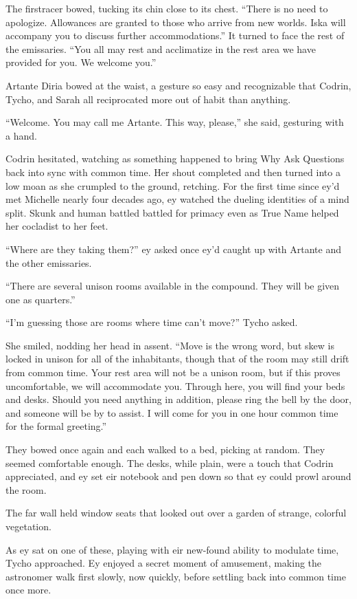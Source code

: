 The firstracer bowed, tucking its chin close to its chest. ``There is no need to apologize. Allowances are granted to those who arrive from new worlds. Iska will accompany you to discuss further accommodations.'' It turned to face the rest of the emissaries. ``You all may rest and acclimatize in the rest area we have provided for you. We welcome you.''

Artante Diria bowed at the waist, a gesture so easy and recognizable that Codrin, Tycho, and Sarah all reciprocated more out of habit than anything.

``Welcome. You may call me Artante. This way, please,'' she said, gesturing with a hand.

Codrin hesitated, watching as something happened to bring Why Ask Questions back into sync with common time. Her shout completed and then turned into a low moan as she crumpled to the ground, retching. For the first time since ey'd met Michelle nearly four decades ago, ey watched the dueling identities of a mind split. Skunk and human battled battled for primacy even as True Name helped her cocladist to her feet.

``Where are they taking them?'' ey asked once ey'd caught up with Artante and the other emissaries.

``There are several unison rooms available in the compound. They will be given one as quarters.''

``I'm guessing those are rooms where time can't move?'' Tycho asked.

She smiled, nodding her head in assent. ``Move is the wrong word, but skew is locked in unison for all of the inhabitants, though that of the room may still drift from common time. Your rest area will not be a unison room, but if this proves uncomfortable, we will accommodate you. Through here, you will find your beds and desks. Should you need anything in addition, please ring the bell by the door, and someone will be by to assist. I will come for you in one hour common time for the formal greeting.''

They bowed once again and each walked to a bed, picking at random. They seemed comfortable enough. The desks, while plain, were a touch that Codrin appreciated, and ey set eir notebook and pen down so that ey could prowl around the room.

The far wall held window seats that looked out over a garden of strange, colorful vegetation.

As ey sat on one of these, playing with eir new-found ability to modulate time, Tycho approached. Ey enjoyed a secret moment of amusement, making the astronomer walk first slowly, now quickly, before settling back into common time once more.

